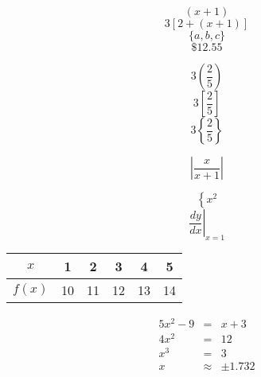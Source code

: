 \documentclass[11pt]{article}
\begin{document}
$$(x+1)$$
$$3[2+(x+1)]$$
$$\{a,b,c\}$$
$$\$12.55$$

$$3\left(\frac{2}{5}\right)$$
$$3\left[\frac{2}{5}\right]$$
$$3\left\{\frac{2}{5}\right\}$$

$$\left|\frac{x}{x+1}\right|$$

$$\left\{x^2\right.$$
$$\left. \frac{dy}{dx} \right|_{x=1}$$

\begin{tabular}{|c|c|c|c|c|c|}
\hline
$x$ & 1 & 2 & 3 & 4 & 5 \\ \hline
$f(x)$ & 10 & 11 & 12 & 13 & 14 \\ \hline

\end{tabular}

\begin{eqnarray*}
5x^2-9&=&x+3 \\
4x^2&=&12 \\ %
x^3&=&3\\
x&\approx&\pm1.732
\end{eqnarray*}
\end{document}
